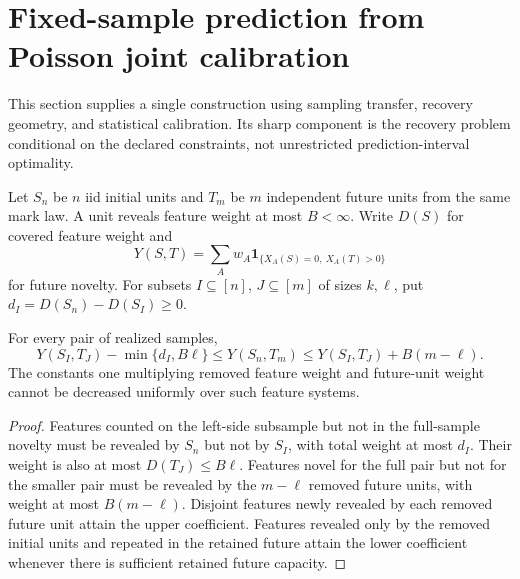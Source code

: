 \documentclass[11pt]{article}
\numberwithin{equation}{section}
\theoremstyle{definition}
\theoremstyle{remark}
\newcommand{\ind}{\mathbf1}\newcommand{\Prob}{\mathcal P}\newcommand{\Ee}{\mathcal E}\newcommand{\Ff}{\mathcal F}
\begin{document}
\section{Fixed-sample prediction from Poisson joint calibration}\label{sec:prediction}
This section supplies a single construction using sampling transfer, recovery geometry, and statistical calibration. Its sharp component is the recovery problem conditional on the declared constraints, not unrestricted prediction-interval optimality.

Let $S_n$ be $n$ iid initial units and $T_m$ be $m$ independent future units from the same mark law. A unit reveals feature weight at most $B<\infty$. Write $D(S)$ for covered feature weight and
\[
 Y(S,T)=\sum_Aw_A\ind_{\{X_A(S)=0,\ X_A(T)>0\}}
\]
for future novelty. For subsets $I\subseteq[n]$, $J\subseteq[m]$ of sizes $k,\ell$, put $d_I=D(S_n)-D(S_I)\ge0$.

\begin{lemma}\label{lem:novelty}
For every pair of realized samples,
\begin{equation}\label{eq:pathnovelty}
 Y(S_I,T_J)-\min\{d_I,B\ell\}
 \le Y(S_n,T_m)
 \le Y(S_I,T_J)+B(m-\ell).
\end{equation}
The constants one multiplying removed feature weight and future-unit weight cannot be decreased uniformly over such feature systems.
\end{lemma}
\begin{proof}
Features counted on the left-side subsample but not in the full-sample novelty must be revealed by $S_n$ but not by $S_I$, with total weight at most $d_I$. Their weight is also at most $D(T_J)\le B\ell$. Features novel for the full pair but not for the smaller pair must be revealed by the $m-\ell$ removed future units, with weight at most $B(m-\ell)$. Disjoint features newly revealed by each removed future unit attain the upper coefficient. Features revealed only by the removed initial units and repeated in the retained future attain the lower coefficient whenever there is sufficient retained future capacity.
\end{proof}
\end{document}

